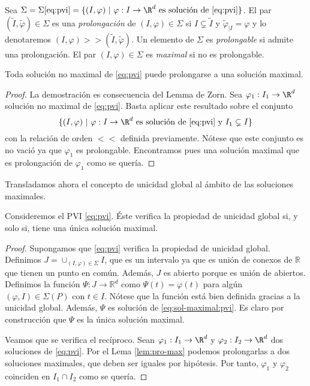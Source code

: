 \documentclass{article}
\begin{document}
\begin{definition}
  Sea
  $\Sigma = \Sigma\eqref{eq:pvi} = \{(I, \varphi) \ | \ \varphi: I \to \R^d \text{ es solución de
    \eqref{eq:pvi}}\}$. El par $(\widetilde{I}, \widetilde{\varphi}) \in \Sigma$ es una
  \emph{prolongación} de $(I, \varphi) \in \Sigma$ si $I \subsetneq \widetilde{I}$ y
  $\widetilde{\varphi}_{|I} = \varphi$ y lo denotaremos
  $(I, \varphi) >> (\widetilde{I}, \tilde{\varphi})$. Un elemento de $\Sigma$ es \emph{prolongable}
  si admite una prolongación.  El par $(I, \varphi) \in \Sigma$ es \emph{maximal} si no es
  prolongable.
\end{definition}

\begin{lemma} \label{lem:pro-max} Toda solución no maximal de \eqref{eq:pvi} puede prolongarse a una
  solución maximal.
\end{lemma}
\begin{proof}
  La demostración es consecuencia del Lemma de Zorn. Sea $\varphi_1: I_1 \to \R^d$ solución no
  maximal de \eqref{eq:pvi}. Basta aplicar este resultado sobre el conjunto
  \[ \{(I, \varphi) \ | \ \varphi: I \to \R^d \text{ es solución de \eqref{eq:pvi}} \text{ y } I_1
    \subsetneq I\} \] con la relación de orden $<<$ definida previamente. Nótese que este conjunto
  es no vació ya que $\varphi_1$ es prolongable. Encontramos pues una solución maximal que es
  prolongación de $\varphi_1$ como se quería.
\end{proof}

Transladamos ahora el concepto de unicidad global al ámbito de las soluciones maximales.

\begin{prop} \label{prop:unicidad-maximal} Consideremos el PVI \eqref{eq:pvi}. Éste verifica la
  propiedad de unicidad global si, y solo si, tiene una única solución maximal.
\end{prop}
\begin{proof}
  Supongamos que \eqref{eq:pvi} verifica la propiedad de unicidad global. Definimos
  $J = \cup_{(I, \varphi) \in \Sigma} I$, que es un intervalo ya que es unión de conexos de
  $\mathbb{R}$ que tienen un punto en común. Además, $J$ es abierto porque es unión de
  abiertos. Definimos la función $\Psi : J \to \mathbb{R}^d$ como $\Psi(t) = \varphi(t)$ para algún
  $(\varphi, I) \in \Sigma(P)$ con $t \in I$. Nótese que la función está bien definida gracias a la
  unicidad global. Además, $\Psi$ es solución de \eqref{eq:sol-maximal:pvi}. Es claro por
  construcción que $\Psi$ es la única solución maximal.

  Veamos que se verifica el recíproco. Sean $\varphi_1: I_1 \to \R^d$ y $\varphi_2: I_2 \to \R^d$
  dos soluciones de \eqref{eq:pvi}. Por el Lema \ref{lem:pro-max} podemos prolongarlas a dos
  soluciones maximales, que deben ser iguales por hipótesis. Por tanto, $\varphi_1$ y $\varphi_2$
  coinciden en $I_1 \cap I_2$ como se quería.
\end{proof}
\end{document}
